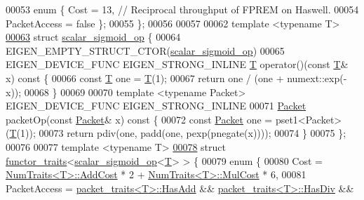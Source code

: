 \begin{DoxyCode}
00053   \textcolor{keyword}{enum} \{ Cost = 13,  \textcolor{comment}{// Reciprocal throughput of FPREM on Haswell.}
00054          PacketAccess = \textcolor{keyword}{false} \};
00055 \};
00056 
00057 
00062 \textcolor{keyword}{template} <\textcolor{keyword}{typename} T>
\hyperlink{struct_eigen_1_1internal_1_1scalar__sigmoid__op}{00063} \textcolor{keyword}{struct }\hyperlink{struct_eigen_1_1internal_1_1scalar__sigmoid__op}{scalar\_sigmoid\_op} \{
00064   EIGEN\_EMPTY\_STRUCT\_CTOR(\hyperlink{struct_eigen_1_1internal_1_1scalar__sigmoid__op}{scalar\_sigmoid\_op})
00065   EIGEN\_DEVICE\_FUNC EIGEN\_STRONG\_INLINE \hyperlink{group___sparse_core___module}{T} operator()(\textcolor{keyword}{const} \hyperlink{group___sparse_core___module}{T}& x)\textcolor{keyword}{ const }\{
00066     \textcolor{keyword}{const} \hyperlink{group___sparse_core___module}{T} one = \hyperlink{group___sparse_core___module}{T}(1);
00067     \textcolor{keywordflow}{return} one / (one + numext::exp(-x));
00068   \}
00069 
00070   \textcolor{keyword}{template} <\textcolor{keyword}{typename} Packet> EIGEN\_DEVICE\_FUNC EIGEN\_STRONG\_INLINE
00071   \hyperlink{union_eigen_1_1internal_1_1_packet}{Packet} packetOp(\textcolor{keyword}{const} \hyperlink{union_eigen_1_1internal_1_1_packet}{Packet}& x)\textcolor{keyword}{ const }\{
00072     \textcolor{keyword}{const} \hyperlink{union_eigen_1_1internal_1_1_packet}{Packet} one = pset1<Packet>(\hyperlink{group___sparse_core___module}{T}(1));
00073     \textcolor{keywordflow}{return} pdiv(one, padd(one, pexp(pnegate(x))));
00074   \}
00075 \};
00076 
00077 \textcolor{keyword}{template} <\textcolor{keyword}{typename} T>
\hyperlink{struct_eigen_1_1internal_1_1functor__traits_3_01scalar__sigmoid__op_3_01_t_01_4_01_4}{00078} \textcolor{keyword}{struct }\hyperlink{struct_eigen_1_1internal_1_1functor__traits}{functor\_traits}<\hyperlink{struct_eigen_1_1internal_1_1scalar__sigmoid__op}{scalar\_sigmoid\_op}<\hyperlink{group___sparse_core___module}{T}> > \{
00079   \textcolor{keyword}{enum} \{
00080     Cost = \hyperlink{group___core___module_struct_eigen_1_1_num_traits}{NumTraits<T>::AddCost} * 2 + 
      \hyperlink{group___core___module_struct_eigen_1_1_num_traits}{NumTraits<T>::MulCost} * 6,
00081     PacketAccess = \hyperlink{struct_eigen_1_1internal_1_1packet__traits}{packet\_traits<T>::HasAdd} && 
      \hyperlink{struct_eigen_1_1internal_1_1packet__traits}{packet\_traits<T>::HasDiv} &&

\end{DoxyCode}
